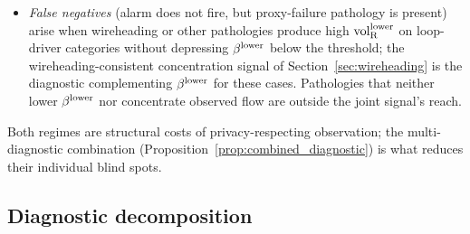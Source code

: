 \begin{remark}
\begin{itemize}
  bound looseness (Part-A's supremum or Part-B's
  max-attribution falling well below the truth on covered
  capabilities), admissibility-filter exclusions, or sparse
  observation rather than degraded exercise.  The gap
  decomposition's cell-attribution is the diagnostic that
  distinguishes these from genuine proxy failure.
\item \emph{False negatives} (alarm does not fire, but
  proxy-failure pathology is present) arise when wireheading
  or other pathologies produce high ${\operatorname{vol}_{\mathrm{R}}^{\mathrm{lower}}}$ on
  loop-driver categories without depressing $\beta^{\mathrm{lower}}$ below the
  threshold; the wireheading-consistent concentration signal
  of Section~\ref{sec:wireheading} is the diagnostic
  complementing $\beta^{\mathrm{lower}}$ for these cases.  Pathologies that
  neither lower $\beta^{\mathrm{lower}}$ nor concentrate observed flow are
  outside the joint signal's reach.
\end{itemize}
Both regimes are structural costs of privacy-respecting
observation; the multi-diagnostic combination
(Proposition~\ref{prop:combined_diagnostic}) is what reduces
their individual blind spots.
\end{remark}

\subsection{Diagnostic decomposition}

